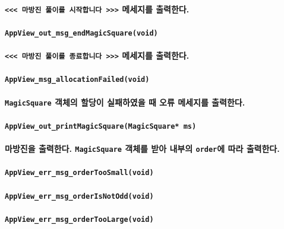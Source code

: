 \documentclass[UTF8]{report}
\begin{document}
            \paragraph{%
                \normalfont \texttt{<<< 마방진 풀이를 시작합니다 >>>} 메세지를 출력한다.
            }

            \paragraph{\texttt{AppView\_out\_msg\_endMagicSquare(void)}}
            \paragraph{%
                \normalfont \texttt{<<< 마방진 풀이를 종료합니다 >>>} 메세지를 출력한다.
            }

            \paragraph{\texttt{AppView\_msg\_allocationFailed(void)}}
            \paragraph{%
                \normalfont \texttt{MagicSquare} 객체의 할당이 실패하였을 때 오류 메세지를 출력한다.
            }

            \paragraph{\texttt{AppView\_out\_printMagicSquare(MagicSquare* ms)}}
            \paragraph{%
                \normalfont 마방진을 출력한다. \texttt{MagicSquare} 객체를 받아 내부의 \texttt{order}에 따라 출력한다.
            }

            \paragraph{\texttt{AppView\_err\_msg\_orderTooSmall(void)}}
            \paragraph{\texttt{AppView\_err\_msg\_orderIsNotOdd(void)}}
            \paragraph{\texttt{AppView\_err\_msg\_orderTooLarge(void)}}
\end{document}
